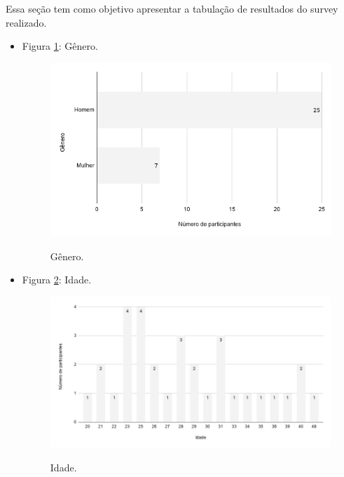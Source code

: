 \label{sec:resultadospesquisa}


Essa seção tem como objetivo apresentar a tabulação de resultados do survey realizado.

\begin{itemize}

    \item Figura \ref{figure:s_genero}: Gênero.
    \begin{figure}[!htb]
    \centering
    \includegraphics[width=.80\textwidth]{images/s_genero.png}
    \label{figure:s_genero}
    \caption{Gênero.}
    \end{figure}
    
    
    \item Figura \ref{figure:s_idade}: Idade.
    \begin{figure}[!htb]
    \centering
    \includegraphics[width=.80\textwidth]{images/s_idade.png}
    \label{figure:s_idade}
    \caption{Idade.}
    \end{figure}
    

\end{itemize}
